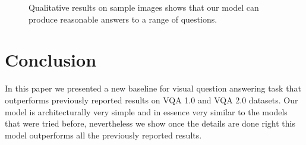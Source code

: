 \documentclass[10pt,twocolumn,letterpaper]{article}
\begin{document}
\begin{figure*}
	\centering
	\caption{Qualitative results on sample images shows that our model can produce reasonable answers to a range of questions.}
	\label{fig:image1}
\end{figure*}

\section{Conclusion}
In this paper we presented a new baseline for visual question answering task that outperforms previously reported results on VQA 1.0 and VQA 2.0 datasets. Our model is architecturally very simple and in essence very similar to the models that were tried before, nevertheless we show once the details are done right this model outperforms all the previously reported results.

{\small


}
\end{document}
